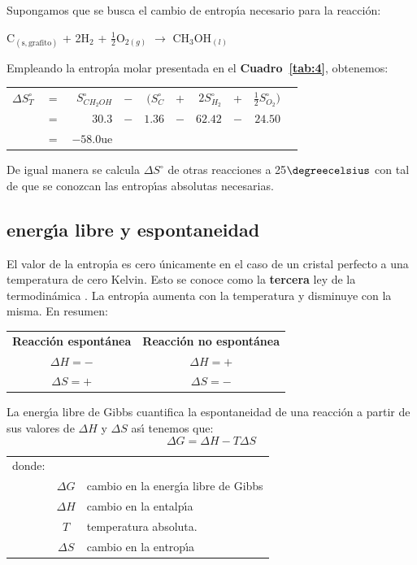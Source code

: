 \begin{example}
 Supongamos que se busca el cambio de entrop\'{\i}a necesario para la reacci\'on:
\begin{center}
C$_{(\mathrm{s,grafito})}$ + 2H$_2$ + $\frac{1}{2}$O$_{2(g)}$ $\longrightarrow$  CH$_3$OH$_{(l)}$
\end{center}
Empleando la entrop\'{\i}a molar presentada en el \textbf{Cuadro~\ref{tab:4}}, obtenemos:

\begin{tabular}{rcrcrcrcrc}
$\Delta S^\circ _T$ &$=$&$S^\circ _{CH_2OH}$&$-$&$(S^\circ
_C$&$+$&$2S^\circ_{H_2}$&+&$\frac{1}{2} S^\circ_{O_2})$\\
&$=$ &$30.3$ & $-$& $1.36$ &$-$&$62.42$&$-$&$24.50$\\
&$=$ &$-58.0 $ue&&&&&&\\
\end{tabular}

De igual manera se calcula $\Delta S^\circ$ de otras reacciones a 25$\degreecelsius$ con tal de que
se conozcan las entrop\'{\i}as absolutas necesarias.
\end{example}

\subsection{energ\'{\i}a libre y espontaneidad}
El valor de la entrop\'{\i}a es cero \'unicamente en el caso de un cristal per\-fec\-to a una temperatura de cero Kelvin. Esto se conoce como la \textbf{tercera} ley de la termodin\'amica . La entrop\'{\i}a aumenta con la temperatura y
disminuye con la mis\-ma. En resumen:\\
\begin{center}
\begin{tabular}{cc}
\textbf{Reacci\'on espont\'anea} & \textbf{Reacci\'on no espont\'anea }\\
$\Delta H = -$ & $\Delta  H = +$\\
$\Delta S = +$ & $\Delta  S = -$ \\
\end{tabular}
\end{center}
La energ\'{\i}a libre de Gibbs cuantifica la espontaneidad de una reacci\'on a partir de sus
valores de $\Delta H$ y $\Delta S$ as\'{\i} tenemos que:
\begin{equation}
\Delta G = \Delta H - T\Delta S
\label{eq:6}
\end{equation}
\begin{tabular}{lcl}
donde:&\\
&$\Delta G$& cambio en la energ\'{\i}a libre de Gibbs \\
&$\Delta H$ &cambio en la entalp\'{\i}a\\
&$T$ &temperatura absoluta.\\
&$\Delta S$ &cambio en la entrop\'{\i}a\\
\end{tabular}

